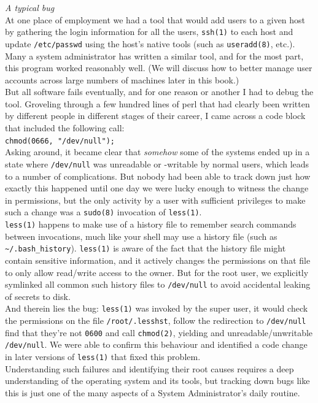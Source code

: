 \begin{experience}
{\em A typical bug} \\

At one place of employment we had a tool that would
add users to a given host by gathering the login
information for all the users, \verb+ssh(1)+ to each
host and update \verb+/etc/passwd+ using the host's
native tools (such as \verb+useradd(8)+, etc.). Many a
system administrator has written a similar tool, and
for the most part, this program worked reasonably
well. (We will discuss how to better manage user
accounts across large numbers of machines later in
this book.) \\ [10pt]

But all software fails eventually, and for one reason
or another I had to debug the tool. Groveling through
a few hundred lines of perl that had clearly been
written by different people in different stages of
their career, I came across a code block that included
the following call: \\ [10pt]

\verb+chmod(0666, "/dev/null");+ \\ [10pt]

Asking around, it became clear that {\em somehow} some
of the systems ended up in a state where
{\tt /dev/null} was unreadable
or -writable by normal users, which leads to a number
of complications.  But nobody had been able to track
down just how exactly this happened until one day we
were lucky enough to witness the change in
permissions,  but the only activity by a user with
sufficient privileges to make such a change was a
\verb+sudo(8)+ invocation of \verb+less(1)+. \\
[10pt]

\verb+less(1)+ happens to make use of a history file
to remember search commands between invocations, much
like your shell may use a history file (such as
\verb+~/.bash_history+). \verb+less(1)+ is aware of
the fact that the history file might contain sensitive
information, and it actively changes the permissions
on that file to only allow read/write access to the
owner.  But for the root user, we explicitly symlinked
all common such history files to \verb+/dev/null+ to
avoid accidental leaking of secrets to disk. \\ [10pt]

And therein lies the bug: \verb+less(1)+ was invoked
by the super user, it would check the permissions on
the file \verb+/root/.lesshst+, follow the redirection
to \verb+/dev/null+ find that they're not \verb+0600+
and call \verb+chmod(2)+, yielding and
unreadable/unwritable \verb+/dev/null+.  We were able
to confirm this behaviour and identified a code change
in later versions of \verb+less(1)+ that fixed this
problem. \\ [10pt]

Understanding such failures and identifying their root
causes requires a deep understanding of the operating
system and its tools, but tracking down bugs like
this\cite{intro:devnull} is just one of the many
aspects of a System Administrator's daily routine.

\end{experience}

